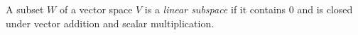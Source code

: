 
A subset $W$ of a vector space $V$ is a \emph{linear subspace} if it contains $0$ and is closed under vector addition and scalar multiplication.
